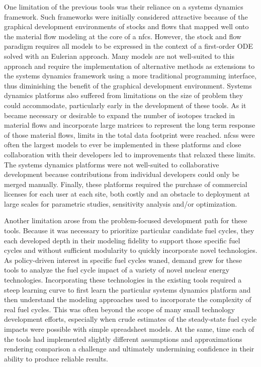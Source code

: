 One limitation of the previous tools was their reliance on a systems dynamics
framework.  Such frameworks were initially considered attractive because of
the graphical development environments of stocks and flows that mapped well
onto the material flow modeling at the core of a \gls{nfcs}.  However, the
stock and flow paradigm requires all models to be expressed in the context of
a first-order ODE solved with an Eulerian approach.  Many models are not
well-suited to this approach and require the implementation of alternative
methods as extensions to the systems dynamics framework using a more
traditional programming interface, thus diminishing the benefit of the graphical
development environment.  Systems dynamics platforms also suffered from
limitations on the size of problem they could accommodate, particularly early
in the development of these tools.  As it became necessary or desirable to
expand the number of isotopes tracked in material flows and incorporate large
matrices to represent the long term response of those material flows, limits
in the total data footprint were reached.  \glspl{nfcs} were often the largest
models to ever be implemented in these platforms and close collaboration with
their developers led to improvements that relaxed these limits.  The systems
dynamics platforms were not well-suited to collaborative development because
contributions from individual developers could only be merged manually.
Finally, these platforms required the purchase of commercial licenses for each
user at each site, both costly and an obstacle to deployment at large scales
for parametric studies, sensitivity analysis and/or optimization.

Another limitation arose from the problem-focused development path for these
tools.  Because it was necessary to prioritize particular candidate fuel
cycles, they each developed depth in their modeling fidelity to support those
specific fuel cycles and without sufficient modularity to quickly incorporate
novel technologies.  As policy-driven interest in specific fuel cycles waned,
demand grew for these tools to analyze the fuel cycle impact of a variety of
novel nuclear energy technologies.  Incorporating these technologies in the
existing tools required a steep learning curve to first learn the particular
systems dynamics platform and then understand the modeling approaches used to
incorporate the complexity of real fuel cycles.  This was often beyond the
scope of many small technology development efforts, especially when crude
estimates of the steady-state fuel cycle impacts were possible with simple
spreadsheet models.  At the same, time each of the tools had implemented
slightly different assumptions and approximations rendering comparison a
challenge and ultimately undermining confidence in their ability to produce
reliable results.

